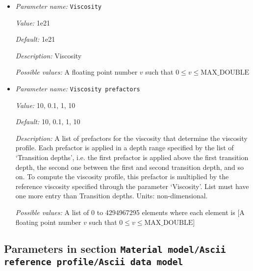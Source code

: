 \begin{itemize}
{\it Value:} false


{\it Default:} false


{\it Description:} Whether to use the TALA instead of the ALA approximation.


{\it Possible values:} A boolean value (true or false)
\item {\it Parameter name:} {\tt Viscosity}
\label{parameters:Material model/Ascii reference profile/Viscosity}
\label{parameters:Material_20model/Ascii_20reference_20profile/Viscosity}


{\it Value:} 1e21


{\it Default:} 1e21


{\it Description:} Viscosity


{\it Possible values:} A floating point number $v$ such that $0 \leq v \leq \text{MAX\_DOUBLE}$
\item {\it Parameter name:} {\tt Viscosity prefactors}
\label{parameters:Material model/Ascii reference profile/Viscosity prefactors}
\label{parameters:Material_20model/Ascii_20reference_20profile/Viscosity_20prefactors}


{\it Value:} 10, 0.1, 1, 10


{\it Default:} 10, 0.1, 1, 10


{\it Description:} A list of prefactors for the viscosity that determine the viscosity profile. Each prefactor is applied in a depth range specified by the list of `Transition depths', i.e. the first prefactor is applied above the first transition depth, the second one between the first and second transition depth, and so on. To compute the viscosity profile, this prefactor is multiplied by the reference viscosity specified through the parameter `Viscosity'. List must have one more entry than Transition depths. Units: non-dimensional.


{\it Possible values:} A list of 0 to 4294967295 elements where each element is [A floating point number $v$ such that $0 \leq v \leq \text{MAX\_DOUBLE}$]
\end{itemize}



\subsection{Parameters in section \tt Material model/Ascii reference profile/Ascii data model}
\label{parameters:Material_20model/Ascii_20reference_20profile/Ascii_20data_20model}

